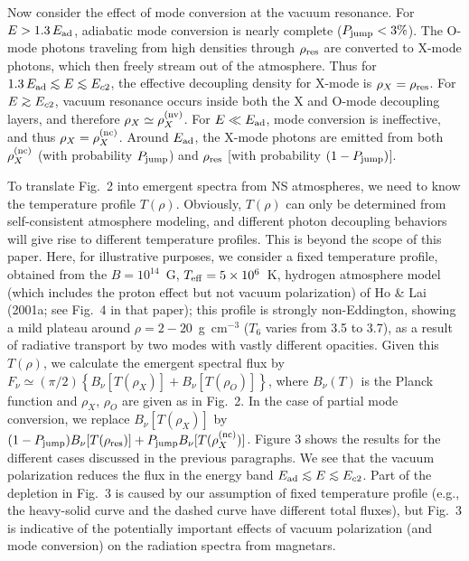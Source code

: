 \documentclass{aastex}
\def\go{\mathrel{\raise.3ex\hbox{$>$}\mkern-14mu
             \lower0.6ex\hbox{$\sim$}}}
\def\lo{\mathrel{\raise.3ex\hbox{$<$}\mkern-14mu
             \lower0.6ex\hbox{$\sim$}}}
\begin{document}
Now consider the effect of mode conversion at the vacuum resonance.
For $E>1.3\,E_{\rm ad}$, adiabatic mode conversion is nearly complete
($P_{\rm jump}<3\%$). The O-mode photons traveling from high densities
through $\rho_{\rm res}$ are converted to X-mode photons, which then
freely stream out of the atmosphere. Thus for
$1.3\,E_{\rm ad}\lo E\lo E_{c2}$,
the effective decoupling density for X-mode is $\rho_X=\rho_{\rm res}$.
For $E\go E_{c2}$, vacuum resonance occurs inside both the X and O-mode
decoupling layers, and therefore $\rho_X\simeq \rho_X^{\rm (nv)}$.
For $E\ll E_{\rm ad}$, mode conversion is ineffective, and thus
$\rho_X=\rho_X^{\rm (nc)}$. Around $E_{\rm ad}$, the X-mode photons
are emitted from both $\rho_X^{\rm (nc)}$ (with probability $P_{\rm jump}$)
and $\rho_{\rm res}$ [with probability $(1-P_{\rm jump})$].

To translate Fig.~2 into emergent spectra from NS atmospheres, 
we need to know the temperature profile $T(\rho)$. Obviously, 
$T(\rho)$ can only be determined
from self-consistent atmosphere modeling, and different photon
decoupling behaviors will give rise to different temperature
profiles. This is beyond the scope of this paper. Here,
for illustrative purposes, we consider a fixed temperature profile,
obtained from the $B=10^{14}$~G, $T_{\rm eff}=5\times 10^6$~K,
hydrogen atmosphere model (which includes the proton effect but not vacuum
polarization) of Ho \& Lai (2001a; see Fig.~4 in that paper); this
profile is strongly non-Eddington, showing a
mild plateau around $\rho=2-20$~g~cm$^{-3}$ ($T_6$ varies from 3.5 to 3.7),
as a result of radiative transport by two modes with vastly different
opacities. Given this $T(\rho)$, we calculate the emergent spectral flux by
$F_\nu\simeq (\pi/2) \left\{B_\nu[T(\rho_X)]+B_\nu[T(\rho_O)]\right\}$,
where $B_\nu(T)$ is the Planck function and $\rho_X,\,\rho_O$ are
given as in Fig.~2. In the case of partial mode
conversion, we replace $B_\nu[T(\rho_X)]$ by $(1-P_{\rm jump})
B_\nu[T(\rho_{\rm res})]+P_{\rm jump}B_\nu [T(\rho_X^{\rm (nc)})]$.
Figure 3 shows the results for the different cases discussed
in the previous paragraphs. We see that the vacuum polarization
reduces the flux in the energy band $E_{\rm ad}\lo E\lo E_{c2}$.
Part of the depletion in Fig.~3 is caused by our
assumption of fixed temperature profile (e.g., the heavy-solid
curve and the dashed curve have different total fluxes), but
Fig.~3 is indicative of the potentially important effects
of vacuum polarization (and mode conversion) on the radiation
spectra from magnetars.
\end{document}
